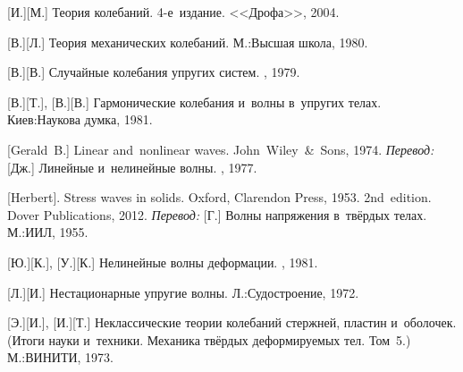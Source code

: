 \begin{thebibliography}{123}
\begin{otherlanguage}{russian}
[И.][М.] Теория колебаний. 4\hbox{-}е~издание. <<Дрофа>>, 2004. 

[В.][Л.] Теория механических колебаний. М.:\;Высшая школа, 1980. 

[В.][В.] Случайные колебания упругих систем. \naukapublisher, 1979. 

[В.][Т.], [В.][В.] Гармонические колебания и~волны в~упругих телах. Киев:\;Наукова думка, 1981. 

[Gerald~B.] Linear and~nonlinear waves. John~Wiley~\&~Sons, 1974. 
\emph{Перевод:} [Дж.] Линейные и~нелинейные волны. \mirpublisher, 1977. 

[Herbert]. Stress waves in solids. Oxford, Clarendon Press, 1953.  2nd~edition. Dover Publications, 2012. 
\emph{Перевод:} [Г.] Волны напряжения в~твёрдых телах. М.:\;ИИЛ, 1955. 

[Ю.][К.], [У.][К.] Нелинейные волны деформации. \naukapublisher, 1981. 

[Л.][И.] Нестационарные упругие волны. Л.:\;Судостроение, 1972. 

[Э.][И.], [И.][Т.] Неклассические теории колебаний стержней, пластин и~оболочек. (Итоги науки и~техники. Механика твёрдых деформируемых тел. Том~5.) М.:\;ВИНИТИ, 1973. 

%
%




\end{otherlanguage}
\end{thebibliography}
